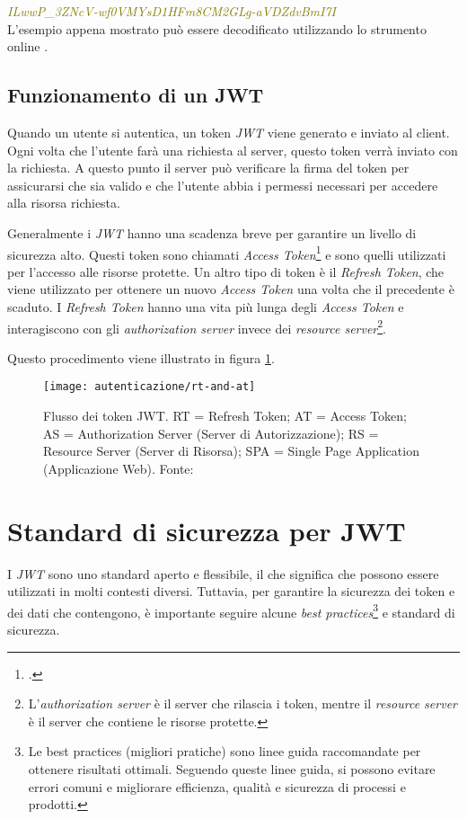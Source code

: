 \noindent \emph{\textcolor{olive}{ILwwP\_3ZNcV-wf0VMYsD1HFm8CM2GLg-aVDZdvBmI7I}}\\

L'esempio appena mostrato può essere decodificato utilizzando lo strumento online \cite{site:jwt-debugger}.


\subsection{Funzionamento di un JWT}
Quando un utente si autentica, un token \emph{JWT} viene generato e inviato al client.
Ogni volta che l'utente farà una richiesta al server, questo token verrà inviato con la richiesta.
A questo punto il server può verificare la firma del token per assicurarsi che sia valido e che l'utente abbia i permessi necessari per accedere alla risorsa richiesta.

Generalmente i \emph{JWT} hanno una scadenza breve per garantire un livello di sicurezza alto.
Questi token sono chiamati \emph{Access Token}\footcite{site:rfc6749} e sono quelli utilizzati per l'accesso alle risorse protette.
Un altro tipo di token è il \emph{Refresh Token}, che viene utilizzato per ottenere un nuovo \emph{Access Token} una volta che il precedente è scaduto.
I \emph{Refresh Token} hanno una vita più lunga degli \emph{Access Token} e interagiscono con gli \emph{authorization server} invece dei \emph{resource server}\footnote{L'\emph{authorization server} è il server che rilascia i token, mentre il \emph{resource server} è il server che contiene le risorse protette.}.

\noindent Questo procedimento viene illustrato in figura \ref{fig:jwt-flow}.

\begin{figure}[!ht] 
    \centering 
    \texttt{[image: autenticazione/rt-and-at]} 
    \caption{Flusso dei token JWT. RT = Refresh Token; AT = Access Token; AS = Authorization Server (Server di Autorizzazione); RS = Resource Server (Server di Risorsa); SPA = Single Page Application (Applicazione Web). Fonte: \cite{site:jwt-flow}}
	\label{fig:jwt-flow}
\end{figure}

\section{Standard di sicurezza per JWT}
I \emph{JWT} sono uno standard aperto e flessibile, il che significa che possono essere utilizzati in molti contesti diversi.
Tuttavia, per garantire la sicurezza dei token e dei dati che contengono, è importante seguire alcune \emph{best practices}\footnote{Le best practices (migliori pratiche) sono linee guida raccomandate per ottenere risultati ottimali. Seguendo queste linee guida, si possono evitare errori comuni e migliorare efficienza, qualità e sicurezza di processi e prodotti.} e standard di sicurezza.

